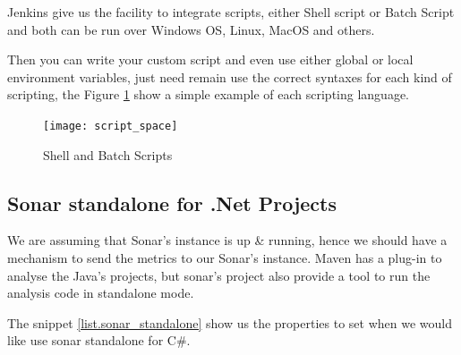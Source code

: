 \documentclass[12pt]{article} %
\begin{document}
Jenkins give us the facility to integrate scripts, either Shell script or Batch Script and both can be run over Windows OS, Linux, MacOS and others.

Then you can write your custom script and even use either global or local environment variables, just need remain  use the correct syntaxes for each kind of scripting, the Figure \ref{fig:script_space} show a simple example of each scripting language.

 \begin{figure}[H] %
 	\center
	{\texttt{[image: script\_space]}}
	\caption{Shell and Batch Scripts}
	\label{fig:script_space}
\end{figure}
 
 \subsection{Sonar standalone for .Net Projects} %

We are assuming that Sonar's instance is up \& running, hence we should have a mechanism to send the metrics to our Sonar's instance. Maven has a plug-in to analyse the Java's projects, but sonar's project also provide a tool to run the analysis code in standalone mode.

The snippet \ref{list.sonar_standalone} show us the properties to set when we would like use sonar standalone for C\#.
\end{document}
